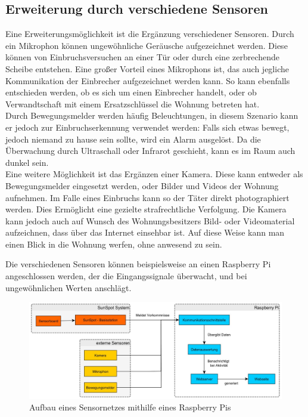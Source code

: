 \subsection{Erweiterung durch verschiedene Sensoren}\label{ss:sensoren}

Eine Erweiterungsmöglichkeit ist die Ergänzung verschiedener Sensoren. 
Durch ein Mikrophon können ungewöhnliche Geräusche aufgezeichnet werden. Diese können von Einbruchsversuchen an einer Tür oder durch eine zerbrechende Scheibe entstehen. Eine großer Vorteil eines Mikrophons ist, das auch jegliche Kommunikation der Einbrecher aufgezeichnet werden kann. So kann ebenfalls entschieden werden, ob es sich um einen Einbrecher handelt, oder ob Verwandtschaft mit einem Ersatzschlüssel die Wohnung betreten hat.\\

Durch Bewegungsmelder werden häufig Beleuchtungen, in diesem Szenario kann er jedoch zur Einbruchserkennung verwendet werden: Falls sich etwas bewegt, jedoch niemand zu hause sein sollte, wird ein Alarm ausgelöst. 
Da die Überwachung durch Ultraschall oder Infrarot geschieht, kann es im Raum auch dunkel sein.\\

Eine weitere Möglichkeit ist das Ergänzen einer Kamera. Diese kann entweder als Bewegungsmelder eingesetzt werden, oder Bilder und Videos der Wohnung aufnehmen. Im Falle eines Einbruchs kann so der Täter direkt photographiert werden. Dies  Ermöglicht eine gezielte strafrechtliche Verfolgung. Die Kamera kann jedoch auch auf Wunsch des Wohnungsbesitzers Bild- oder Videomaterial aufzeichnen, dass über das Internet einsehbar ist. Auf diese Weise kann man einen Blick in die Wohnung werfen, ohne anwesend zu sein.

Die verschiedenen Sensoren können beispielsweise an einen Raspberry Pi angeschlossen werden, der die Eingangssignale überwacht, und bei ungewöhnlichen Werten anschlägt.

\begin{figure}[H] 
	\centering
	\includegraphics[scale=0.22]{Bilder/extSensor}
	\caption{Aufbau eines Sensornetzes mithilfe eines Raspberry Pis}
	\label{f:extSensor}
\end{figure}